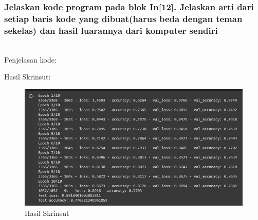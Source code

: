 \subsubsection{Jelaskan kode program pada blok  In[12]. Jelaskan arti dari setiap baris kode yang dibuat(harus beda dengan teman sekelas) dan hasil luarannya dari komputer sendiri}
\hfill\\
Penjelasan kode:

Hasil Skrinsut:
\begin{figure}[H]
	\centering
	\includegraphics[scale=0.5]{figures/1174083/figures7/p12.png}
	\caption{Hasil Skrinsut}
\end{figure}


